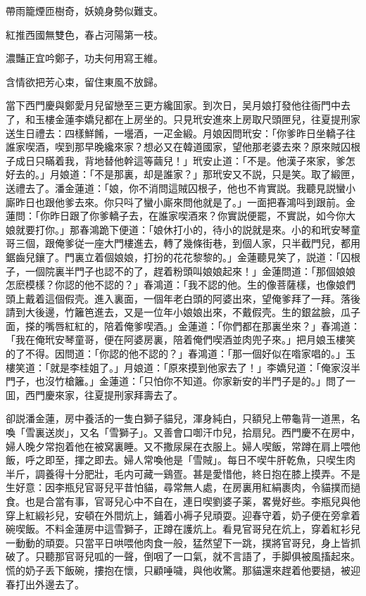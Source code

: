 帶雨籠煙匝樹奇，妖嬈身勢似難支。

紅推西國無雙色，春占河陽第一枝。

濃豔正宜吟鄭子，功夫何用寫王維。

含情欲把芳心束，留住東風不放歸。

當下西門慶與鄭愛月兒留戀至三更方纔囬家。到次日，吴月娘打發他往衙門中去了，和玉樓金蓮李嬌兒都在上房坐的。只見玳安進來上房取尺頭匣兒，往夏提刑家送生日禮去：四樣鮮餚，一壜酒，一疋金緞。月娘因問玳安：「你爹昨日坐轎子往誰家喫酒，喫到那早晚纔來家？想必又在韓道國家，望他那老婆去來？原來賊囚根子成日只瞞着我，背地替他幹這等繭兒！」玳安止道：「不是。他漢子來家，爹怎好去的。」月娘道：「不是那裏，却是誰家？」那玳安又不説，只是笑。取了緞匣，送禮去了。潘金蓮道：「娘，你不消問這賊囚根子，他也不肯實説。我聽見説蠻小廝昨日也跟他爹去來。你只呌了蠻小廝來問他就是了。」一面把春鴻呌到跟前。金蓮問：「你昨日跟了你爹轎子去，在誰家喫酒來？你實説便罷，不實説，如今你大娘就要打你。」那春鴻跪下便道：「娘休打小的，待小的説就是來。小的和玳安琴童哥三個，跟俺爹従一座大門樓進去，轉了幾條街巷，到個人家，只半截門兒，都用鋸齒兒鑲了。門裏立着個娘娘，打扮的花花黎黎的。」金蓮聽見笑了，説道：「囚根子，一個院裏半門子也認不的了，趕着粉頭叫娘娘起來！」金蓮問道：「那個娘娘怎麽模樣？你認的他不認的？」春鴻道：「我不認的他。生的像菩薩樣，也像娘們頭上戴着這個假壳。進入裏面，一個年老白頭的阿婆出來，望俺爹拜了一拜。落後請到大後邊，竹籬笆進去，又是一位年小娘娘出來，不戴假壳。生的銀盆臉，瓜子面，搽的嘴唇紅紅的，陪着俺爹喫酒。」金蓮道：「你們都在那裏坐來？」春鴻道：「我在俺玳安琴童哥，便在阿婆房裏，陪着俺們喫酒並肉兜子來。」把月娘玉樓笑的了不得。因問道：「你認的他不認的？」春鴻道：「那一個好似在喒家唱的。」玉樓笑道：「就是李桂姐了。」月娘道：「原來摸到他家去了！」李嬌兒道：「俺家沒半門子，也沒竹槍籬。」金蓮道：「只怕你不知道。你家新安的半門子是的。」問了一囬，西門慶來家，往夏提刑家拜壽去了。

卻説潘金蓮，房中養活的一隻白獅子貓兒，渾身純白，只額兒上帶龜背一道黑，名喚「雪裏送炭」，又名「雪獅子」。又善會口啣汗巾兒，拾扇兒。西門慶不在房中，婦人晚夕常抱着他在被窝裏睡。又不撒尿屎在衣服上。婦人喫飯，常蹲在肩上喂他飯，呼之即至，揮之即去。婦人常喚他是「雪賊」。每日不喫牛肝乾魚，只喫生肉半斤，調養得十分肥壯，毛内可藏一鷄疍。甚是愛惜他，終日抱在膝上摸弄。不是生好意：因李瓶兒官哥兒平昔怕貓，尋常無人處，在房裏用紅絹裹肉，令貓撲而撾食。也是合當有事，官哥兒心中不自在，連日喫劉婆子薬，畧覺好些。李瓶兒與他穿上紅緞衫兒，安頓在外間炕上，鋪着小褥子兒頑耍。迎春守着，奶子便在旁拿着碗喫飯。不料金蓮房中這雪獅子，正蹲在護炕上。看見官哥兒在炕上，穿着紅衫兒一動動的頑耍。只當平日哄喂他肉食一般，猛然望下一跳，撲將官哥兒，身上皆抓破了。只聽那官哥兒呱的一聲，倒咽了一口氣，就不言語了，手脚俱被風搐起來。慌的奶子丢下飯碗，摟抱在懷，只顧唾噦，與他收驚。那貓還來趕着他要撾，被迎春打出外邊去了。

